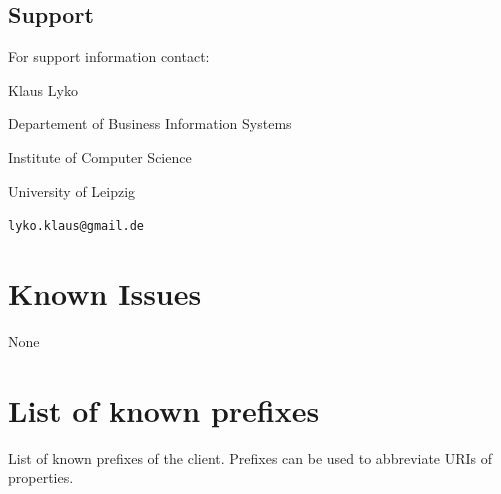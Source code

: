 \documentclass{article}
\begin{document}
\subsection{Support}

For support information  contact:

Klaus Lyko

Departement of Business Information Systems

Institute of Computer Science

University of Leipzig

\verb#lyko.klaus@gmail.de#

\section{Known Issues}
None

\appendix
\section{List of known prefixes}
List of known prefixes of the client. Prefixes can be used to abbreviate URIs of properties.
\end{document}
